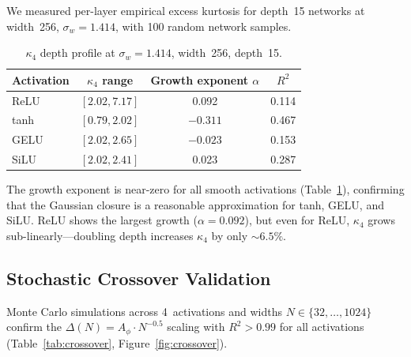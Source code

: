 \documentclass[10pt]{article}
\begin{document}
We measured per-layer empirical excess kurtosis for depth~15 networks at width~256, $\sigma_w = 1.414$, with 100 random network samples.

\begin{table}[t]
\centering
\caption{$\kappa_4$ depth profile at $\sigma_w = 1.414$, width~256, depth~15.}
\label{tab:kappa4-scaling}
\small
\begin{tabular}{@{}lccc@{}}
\toprule
\textbf{Activation} & \textbf{$\kappa_4$ range} & \textbf{Growth exponent $\alpha$} & $R^2$ \\
\midrule
ReLU  & $[2.02, 7.17]$ & 0.092 & 0.114 \\
tanh  & $[0.79, 2.02]$ & $-0.311$ & 0.467 \\
GELU  & $[2.02, 2.65]$ & $-0.023$ & 0.153 \\
SiLU  & $[2.02, 2.41]$ & 0.023 & 0.287 \\
\bottomrule
\end{tabular}
\end{table}

The growth exponent is near-zero for all smooth activations (Table~\ref{tab:kappa4-scaling}), confirming that the Gaussian closure is a reasonable approximation for tanh, GELU, and SiLU.
ReLU shows the largest growth ($\alpha = 0.092$), but even for ReLU, $\kappa_4$ grows sub-linearly---doubling depth increases $\kappa_4$ by only $\sim 6.5\%$.

\subsection{Stochastic Crossover Validation}

Monte Carlo simulations across 4~activations and widths $N \in \{32, \ldots, 1024\}$ confirm the $\Delta(N) = A_\phi \cdot N^{-0.5}$ scaling with $R^2 > 0.99$ for all activations (Table~\ref{tab:crossover}, Figure~\ref{fig:crossover}).
\end{document}
